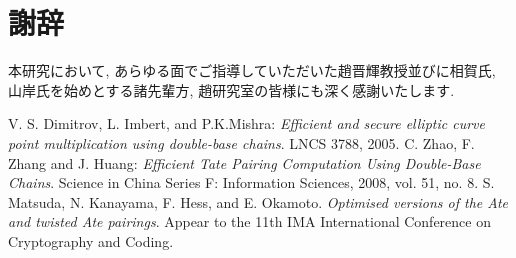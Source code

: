 \documentclass[twocolumn]{jsarticle} %
\begin{document}
\section*{謝辞}
本研究において, あらゆる面でご指導していただいた趙晋輝教授並びに相賀氏, 山岸氏を始めとする諸先輩方, 趙研究室の皆様にも深く感謝いたします.

\begin{thebibliography}{99}
 V. S. Dimitrov, L. Imbert, and P.K.Mishra: {\em Efficient and secure elliptic curve point multiplication using double-base chains}. LNCS 3788, 2005.
 C. Zhao, F. Zhang and J. Huang: {\em Efficient Tate Pairing Computation Using Double-Base Chains}. Science in China Series F: Information Sciences, 2008, vol. 51, no. 8.
 S. Matsuda, N. Kanayama, F. Hess, and E. Okamoto. {\em Optimised versions of the Ate and twisted Ate pairings}. Appear to the 11th IMA International Conference on Cryptography and Coding.
\end{thebibliography}

\end{document}
